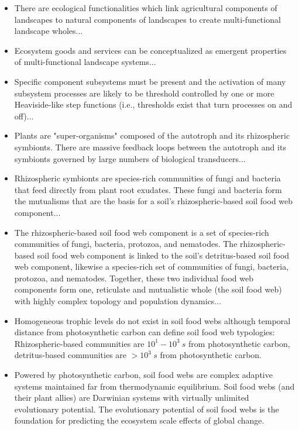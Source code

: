\begin{itemize}
  \item There are ecological functionalities which link agricultural components of landscapes to natural components of landscapes to create multi-functional landscape wholes...
  
  \item Ecosystem goods and services can be conceptualized as emergent properties of multi-functional landscape systems...
  
  \item Specific component subsystems must be present and the activation of many subsystem processes are likely to be threshold controlled by one or more Heaviside-like step functions (i.e., thresholds exist that turn processes on and off)...

  \item Plants are "super-organisms" composed of the autotroph and its rhizospheric symbionts. There are massive feedback loops between the autotroph and its symbionts governed by large numbers of biological transducers...
  
  \item Rhizospheric symbionts are species-rich communities of fungi and bacteria that feed directly from plant root exudates. These fungi and bacteria form the mutualisms that are the basis for a soil's rhizospheric-based soil food web component...

  \item The rhizospheric-based soil food web component is a set of species-rich communities of fungi, bacteria, protozoa, and nematodes. The rhizospheric-based soil food web component is linked to the soil's detritus-based soil food web component, likewise a species-rich set of communities of fungi, bacteria, protozoa, and nematodes. Together, these two individual food web components form one, reticulate and mutualistic whole (the soil food web) with highly complex topology and population dynamics...
  
  \item Homogeneous trophic levels do not exist in soil food webs although temporal distance from photosynthetic carbon can define soil food web typologies: Rhizospheric-based communities are $10^{1} - 10^{3} \ s$ from photosynthetic carbon, detritus-based communities are $ > 10^{3} \ s$ from photosynthetic carbon.  
  
  \item Powered by photosynthetic carbon, soil food webs are complex adaptive systems maintained far from thermodynamic equilibrium. Soil food webs (and their plant allies) are Darwinian systems with virtually unlimited evolutionary potential. The evolutionary potential of soil food webs is the foundation for predicting the ecosystem scale effects of global change.
  

\end{itemize}

